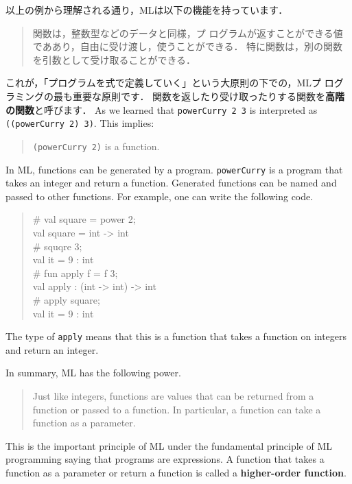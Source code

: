 \documentclass{jbook}
\begin{document}
	以上の例から理解される通り，MLは以下の機能を持っています．
\begin{quote}
	関数は，整数型などのデータと同様，プ
ログラムが返すことができる値でああり，自由に受け渡し，使うことができる．
	特に関数は，別の関数を引数として受け取ることができる．
\end{quote}
	これが，「プログラムを式で定義していく」という大原則の下での，MLプ
ログラミングの最も重要な原則です．
	関数を返したり受け取ったりする関数を{\bf 高階の関数}と呼びます．
\else%
	As we learned that {\tt powerCurry 2 3} is interpreted as {\tt
((powerCurry 2) 3)}. 
	This implies:
\begin{quote}
{\tt (powerCurry 2)} is a function.
\end{quote}
	In ML, functions can be generated by a program.
	{\tt powerCurry} is a program that takes an integer and return a
function.
	Generated functions can be named and passed to other functions.	
	For example, one can write the following code.
\begin{quote}
\# val square = power 2;\\
val square = int -> int\\
\# squqre 3;\\
val it = 9 : int\\
\# fun apply f = f 3;\\
val apply : (int -> int) -> int\\
\# apply square;\\
val it = 9 : int
\end{quote}
	The type of {\tt apply} means that this is a function that takes
a function on integers and return an integer.

	In summary, ML has the following power.
\begin{quote}
	Just like integers, functions are values that can be returned
from a function or passed to a function.
	In particular, a function can take a function as a parameter. 
\end{quote}
	This is the important principle of ML under the fundamental
principle of ML programming saying that programs are expressions.
	A function that takes a function as a parameter or return a
function is called a {\bf higher-order function}.
\fi%
\end{document}
